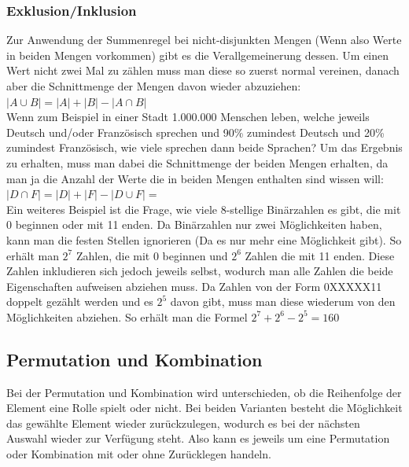 \documentclass{article}
\begin{document}
	\subsubsection{Exklusion/Inklusion}
	Zur Anwendung der Summenregel bei nicht-disjunkten Mengen (Wenn also Werte in beiden Mengen vorkommen) gibt es die Verallgemeinerung dessen. Um einen Wert nicht zwei Mal zu zählen muss man diese so zuerst normal vereinen, danach aber die Schnittmenge der Mengen davon wieder abzuziehen: $|A\cup B| = |A|+|B|-|A\cap B|$ \\
	Wenn zum Beispiel in einer Stadt 1.000.000 Menschen leben, welche jeweils Deutsch und/oder Französisch sprechen und 90\% zumindest Deutsch und 20\% zumindest Französisch, wie viele sprechen dann beide Sprachen? Um das Ergebnis zu erhalten, muss man dabei die Schnittmenge der beiden Mengen erhalten, da man ja die Anzahl der Werte die in beiden Mengen enthalten sind wissen will: $|D\cap F| = |D| + |F| - |D\cup F| =$ \\
	Ein weiteres Beispiel ist die Frage, wie viele 8-stellige Binärzahlen es gibt, die mit 0 beginnen oder mit 11 enden. Da Binärzahlen nur zwei Möglichkeiten haben, kann man die festen Stellen ignorieren (Da es nur mehr eine Möglichkeit gibt). So erhält man $2^7$ Zahlen, die mit 0 beginnen und $2^6$ Zahlen die mit 11 enden. Diese Zahlen inkludieren sich jedoch jeweils selbst, wodurch man alle Zahlen die beide Eigenschaften aufweisen abziehen muss. Da Zahlen von der Form 0XXXXX11 doppelt gezählt werden und es $2^5$ davon gibt, muss man diese wiederum von den Möglichkeiten abziehen. So erhält man die Formel $2^7+2^6-2^5=160$ 
	\subsection{Permutation und Kombination}
	Bei der Permutation und Kombination wird unterschieden, ob die Reihenfolge der Element eine Rolle spielt oder nicht. Bei beiden Varianten besteht die Möglichkeit das gewählte Element wieder zurückzulegen, wodurch es bei der nächsten Auswahl wieder zur Verfügung steht. Also kann es jeweils um eine Permutation oder Kombination mit oder ohne Zurücklegen handeln.
\end{document}
